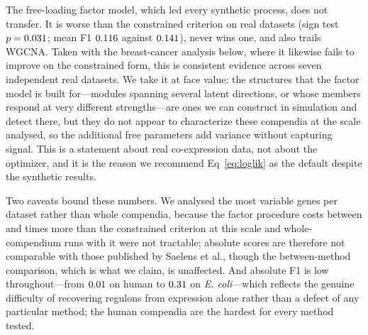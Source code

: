 The free-loading factor model, which led every synthetic process, does not
transfer. It is worse than the constrained criterion on \SaelensFactorBeaten{} real datasets (sign test $p=0.031{}$; mean F1
$0.116{}$ against $0.141{}$), never wins one, and also
trails WGCNA. Taken with the breast-cancer analysis below, where it likewise
fails to improve on the constrained form, this is consistent evidence across
seven independent real datasets. We take it at face value: the structures that
the factor model is built for---modules spanning several latent directions, or
whose members respond at very different strengths---are ones we can construct in
simulation and detect there, but they do not appear to characterize these
compendia at the scale analysed, so the additional free parameters add variance
without capturing signal. This is a statement about real co-expression data, not
about the optimizer, and it is the reason we recommend Eq~\eqref{eq:loglik} as
the default despite the synthetic results.

Two caveats bound these numbers. We analysed the \SaelensNTop{} most variable
genes per dataset rather than whole compendia, because the factor procedure costs
between \SaelensCostRatioMin{} and \SaelensCostRatioMax{} times more than the constrained criterion at this
scale and whole-compendium runs with it were not tractable; absolute scores are
therefore not comparable with those published by Saelens et al., though the
between-method comparison, which is what we claim, is unaffected. And absolute F1
is low throughout---from $0.01{}$ on human to $0.31{}$ on \emph{E. coli}---which
reflects the genuine difficulty of recovering regulons from expression alone
rather than a defect of any particular method; the human compendia are the
hardest for every method tested.

\begin{table}[!ht]
\centering
\caption{\textbf{Recovery of curated modules on the Saelens et al. benchmark}
(F1 of recovery and relevance; higher is better). Best method per dataset in
bold. All methods see the same \SaelensNTop{} most variable genes per dataset.}
\label{tab:saelens}
\begin{adjustwidth}{-1.25in}{0in}
\centering
{}
\end{adjustwidth}
\end{table}

